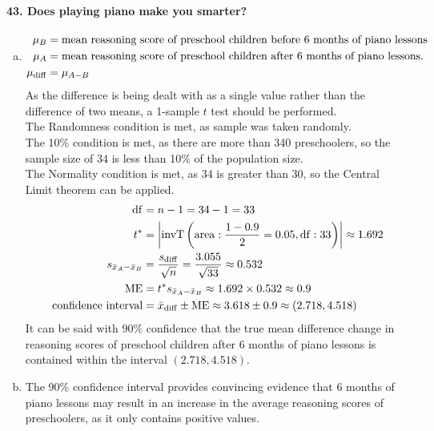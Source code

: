 \documentclass[../Homework]{subfiles}
\begin{document}
			\paragraph{43. Does playing piano make you smarter?}
				\begin{enumerate}[a.]
					\item
						\begin{align*}
							\mu_B &= \text{mean reasoning score of preschool children before 6 months of piano lessons} \\
							\mu_A &= \text{mean reasoning score of preschool children after 6 months of piano lessons.} \\
							\mu_{\mathrm{diff}} &= \mu_{A - B}
						\end{align*}
						As the difference is being dealt with as a single value rather than the difference of two means, a 1-sample $t$ test should be performed. \\
						The Randomness condition is met, as sample was taken randomly. \\
						The 10\% condition is met, as there are more than 340 preschoolers, so the sample size of 34 is less than 10\% of the population size. \\
						The Normality condition is met, as 34 is greater than 30, so the Central Limit theorem can be applied.
						\begin{align*}
							\operatorname{df} &= n - 1 = 34 - 1 = 33 \\
							t^* &= \left|\operatorname{invT}\left(\operatorname{area}: \frac{1 - 0.9}{2} = 0.05, \operatorname{df}: 33\right)\right| \approx 1.692 \\
							s_{\bar{x}_A - \bar{x}_B} &= \frac{s_{\mathrm{diff}}}{\sqrt{n}} = \frac{3.055}{\sqrt{33}} \approx 0.532 \\
							\operatorname{ME} &= t^*s_{\bar{x}_A - \bar{x}_B} \approx 1.692 \times 0.532 \approx 0.9\\
							\text{confidence interval} &= \bar{x}_{\mathrm{diff}} \pm \operatorname{ME} \approx 3.618 \pm 0.9 \approx (2.718, 4.518)
						\end{align*}
						It can be said with 90\% confidence that the true mean difference change in reasoning scores of preschool children after 6 months of piano lessons is contained within the interval $(2.718, 4.518)$.
					\item
						The 90\% confidence interval provides convincing evidence that 6 months of piano lessons may result in an increase in the average reasoning scores of preschoolers, as it only contains positive values.
				\end{enumerate}
\end{document}
